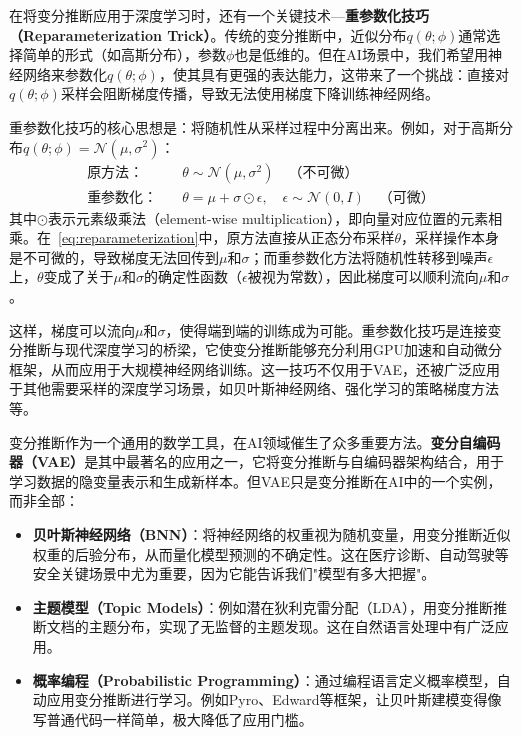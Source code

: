 在将变分推断应用于深度学习时，还有一个关键技术---\textbf{重参数化技巧（Reparameterization Trick）}。传统的变分推断中，近似分布$q(\theta;\phi)$通常选择简单的形式（如高斯分布），参数$\phi$也是低维的。但在AI场景中，我们希望用神经网络来参数化$q(\theta;\phi)$，使其具有更强的表达能力，这带来了一个挑战：直接对$q(\theta;\phi)$采样会阻断梯度传播，导致无法使用梯度下降训练神经网络。

重参数化技巧的核心思想是：将随机性从采样过程中分离出来。例如，对于高斯分布$q(\theta;\phi) = \mathcal{N}(\mu, \sigma^2)$：
\begin{align}\label{eq:reparameterization}
\text{原方法}：&\quad \theta \sim \mathcal{N}(\mu, \sigma^2) \quad \text{（不可微）} \\
\text{重参数化}：&\quad \theta = \mu + \sigma \odot \epsilon, \quad \epsilon \sim \mathcal{N}(0, I) \quad \text{（可微）}
\end{align}
其中$\odot$表示元素级乘法（element-wise multiplication），即向量对应位置的元素相乘。在~\eqref{eq:reparameterization}中，原方法直接从正态分布采样$\theta$，采样操作本身是不可微的，导致梯度无法回传到$\mu$和$\sigma$；而重参数化方法将随机性转移到噪声$\epsilon$上，$\theta$变成了关于$\mu$和$\sigma$的确定性函数（$\epsilon$被视为常数），因此梯度可以顺利流向$\mu$和$\sigma$。

这样，梯度可以流向$\mu$和$\sigma$，使得端到端的训练成为可能。重参数化技巧是连接变分推断与现代深度学习的桥梁，它使变分推断能够充分利用GPU加速和自动微分框架，从而应用于大规模神经网络训练。这一技巧不仅用于VAE，还被广泛应用于其他需要采样的深度学习场景，如贝叶斯神经网络、强化学习的策略梯度方法等。


变分推断作为一个通用的数学工具，在AI领域催生了众多重要方法。\textbf{变分自编码器（VAE）}是其中最著名的应用之一，它将变分推断与自编码器架构结合，用于学习数据的隐变量表示和生成新样本。但VAE只是变分推断在AI中的一个实例，而非全部：
\begin{itemize}
\item \textbf{贝叶斯神经网络（BNN）}：将神经网络的权重视为随机变量，用变分推断近似权重的后验分布，从而量化模型预测的不确定性。这在医疗诊断、自动驾驶等安全关键场景中尤为重要，因为它能告诉我们"模型有多大把握"。

\item \textbf{主题模型（Topic Models）}：例如潜在狄利克雷分配（LDA），用变分推断推断文档的主题分布，实现了无监督的主题发现。这在自然语言处理中有广泛应用。

\item \textbf{概率编程（Probabilistic Programming）}：通过编程语言定义概率模型，自动应用变分推断进行学习。例如Pyro、Edward等框架，让贝叶斯建模变得像写普通代码一样简单，极大降低了应用门槛。
\end{itemize}


